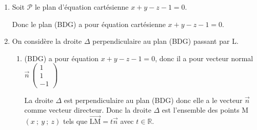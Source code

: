 \documentclass[10pt]{article}
\providecommand{\R}{\mathbb{R}}
\providecommand{\vect}[1]{\overrightarrow{#1}}
\providecommand{\vectt}[1]{\overrightarrow{\mathrm{#1}}}
\begin{document}
\begin{enumerate}
\begin{enumerate}
{$\vectt{IL} = \dfrac{3}{4} \vectt{IG}	
\iff
\left \{
\begin{array}{l !{=} l}
x_{\text L} - \frac{1}{2} & \frac{3}{4} \times \frac{1}{2} \\ 
y_{\text L} - \frac{1}{2} & \frac{3}{4} \times \frac{1}{2}\\ 
z_{\text L} &\frac{3}{4} \times 1
\end{array}
\right .
\iff
\left \{
\begin{array}{l !{=}l}
x_{\text L} & \frac{3}{8} + \frac{1}{2} \\ 
y_{\text L} &\frac{3}{8} + \frac{1}{2}\\ 
z_{\text L} &\frac{3}{4}
\end{array}
\right .
\iff
\left \{
\begin{array}{l !{=}l}
x_{\text L} & \frac{7}{8} \\ 
y_{\text L} &\frac{7}{8}\\ 
z_{\text L} &\frac{3}{4}
\end{array}
\right .$
}
	\end{enumerate}
	
\item Soit $\mathcal{P}$ le plan d'équation cartésienne $x + y - z - 1 = 0$.


Donc le plan (BDG) a pour équation cartésienne $x + y - z - 1 = 0$.

\item On considère la droite $\Delta$ perpendiculaire au plan (BDG) passant par L.
	\begin{enumerate}
		\item 
(BDG) a pour équation $x+y-z-1=0$, donc il a pour vecteur normal
$\vect{n}\,\begin{pmatrix} 1 \\ 1 \\ -1\end{pmatrix}$

La droite $\Delta$ est perpendiculaire au plan (BDG) donc elle a le vecteur $\vect{n}$ comme vecteur directeur.
Donc la droite $\Delta$ est l'ensemble des points M\,$(x~;~y~;~z)$ tels que $\vectt{LM}=t\vect{n}$ avec $t\in\R$.


\end{enumerate}
\end{enumerate}
\end{document}
